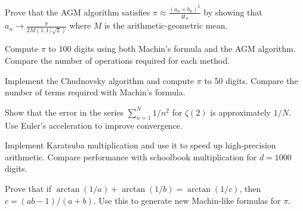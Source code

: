 \begin{exercise}
Prove that the AGM algorithm satisfies $\pi \approx \frac{(a_n + b_n)^2}{4t_n}$ by showing that $a_n \to \frac{\pi}{2M(1,1/\sqrt{2})}$ where $M$ is the arithmetic-geometric mean.
\end{exercise}

\begin{exercise}
Compute $\pi$ to 100 digits using both Machin's formula and the AGM algorithm. Compare the number of operations required for each method.
\end{exercise}

\begin{exercise}[Computational]
Implement the Chudnovsky algorithm and compute $\pi$ to 50 digits. Compare the number of terms required with Machin's formula.
\end{exercise}

\begin{exercise}
Show that the error in the series $\sum_{n=1}^{N} 1/n^2$ for $\zeta(2)$ is approximately $1/N$. Use Euler's acceleration to improve convergence.
\end{exercise}

\begin{exercise}
Implement Karatsuba multiplication and use it to speed up high-precision arithmetic. Compare performance with schoolbook multiplication for $d = 1000$ digits.
\end{exercise}

\begin{exercise}
Prove that if $\arctan(1/a) + \arctan(1/b) = \arctan(1/c)$, then $c = (ab-1)/(a+b)$. Use this to generate new Machin-like formulas for $\pi$.
\end{exercise}
